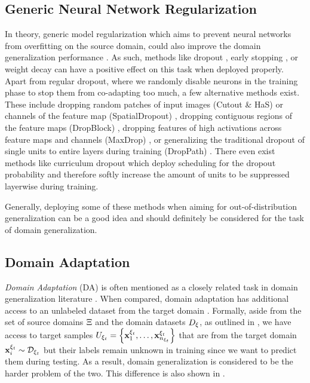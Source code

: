 \subsection{Generic Neural Network Regularization}

In theory, generic model regularization which aims to prevent neural networks from overfitting on the source domain, could also improve the domain generalization performance \citep{huang2020selfchallenging}. As such, methods like dropout \citep{SrivastavaHKSS14}, early stopping \citep{CaruanaLG00}, or weight decay \citep{NowlanH92} can have a positive effect on this task when deployed properly. Apart from regular dropout, where we randomly disable neurons in the training phase to stop them from co-adapting too much, a few alternative methods exist. These include dropping random  patches of input images (Cutout \& HaS) \citep{devries2017improved, SinghL17} or channels of the feature map (SpatialDropout) \citep{TompsonGJLB15}, dropping contiguous regions of the feature maps (DropBlock) \citep{GhiasiLL18}, dropping features of high activations across feature maps and channels (MaxDrop) \citep{ParkK16}, or generalizing the traditional dropout of single units to entire layers during training (DropPath) \citep{LarssonMS17}. There even exist methods like curriculum dropout \citep{MorerioCVVM17} which deploy scheduling for the dropout probability and therefore softly increase the amount of units to be suppressed layerwise during training. 

Generally, deploying some of these methods when aiming for out-of-distribution generalization can be a good idea and should definitely be considered for the task of domain generalization.


\subsection{Domain Adaptation}

\emph{Domain Adaptation} (DA) is often mentioned as a closely related task in domain generalization literature \citep{MotiianPAD17, VolpiM19, QiaoZP20}. When compared, domain adaptation has additional access to an unlabeled dataset from the target domain \citep{mancini2020, Csurka17}. Formally, aside from the set of source domains $\Xi$ and the domain datasets $D_\xi$, as outlined in , we have access to target samples $U_{\xi_t} = \left\{\mathbf{x}_1^{\xi_t},\dots,\mathbf{x}_{n_{\xi_t}}^{\xi_t}\right\}$ that are from the target domain $\mathbf{x}_i^{\xi_t} \sim \mathcal{D}_{\xi_t}$ but their labels remain unknown in training since we want to predict them during testing. As a result, domain generalization is considered to be the harder problem of the two. This difference is also shown in .

